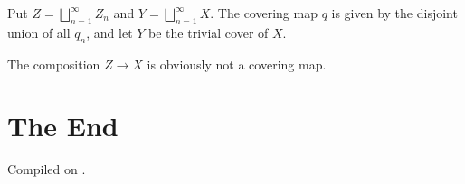 \documentclass{article}
\begin{document}

\newpage
Put $Z=\bigsqcup_{n=1}^\infty Z_n$ and $Y=\bigsqcup_{n=1}^\infty X$. The covering map $q$ is given by the disjoint union of all $q_n$, and let $Y$ be the trivial cover of $X$. 

The composition $Z\longrightarrow X$ is obviously not a covering map.

\section*{The End}



\noindent Compiled on \todayymd.

\noindent\home
\end{document}
